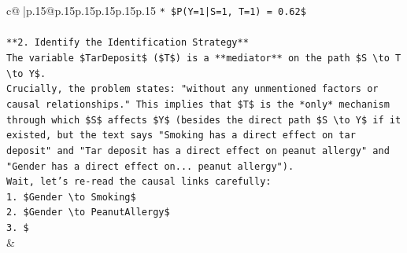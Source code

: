 \documentclass{article}
\begin{document}
{\begin{supertabular}{c@{$\;$}|p{.15\linewidth}@{}p{.15\linewidth}p{.15\linewidth}p{.15\linewidth}p{.15\linewidth}p{.15\linewidth}}
{{{\texttt{*   \$P(Y=1|S=1, T=1) = 0.62\$} \\
\\ 
\texttt{**2. Identify the Identification Strategy**} \\
\texttt{The variable \$TarDeposit\$ (\$T\$) is a **mediator** on the path \$S \textbackslash{}to T \textbackslash{}to Y\$.} \\
\texttt{Crucially, the problem states: "without any unmentioned factors or causal relationships." This implies that \$T\$ is the *only* mechanism through which \$S\$ affects \$Y\$ (besides the direct path \$S \textbackslash{}to Y\$ if it existed, but the text says "Smoking has a direct effect on tar deposit" and "Tar deposit has a direct effect on peanut allergy" and "Gender has a direct effect on... peanut allergy").} \\
\texttt{Wait, let's re{-}read the causal links carefully:} \\
\texttt{1.  \$Gender \textbackslash{}to Smoking\$} \\
\texttt{2.  \$Gender \textbackslash{}to PeanutAllergy\$} \\
\texttt{3.  \$} \\
            }
        }
    }
    & \\ \\


\end{supertabular}}
\end{document}
